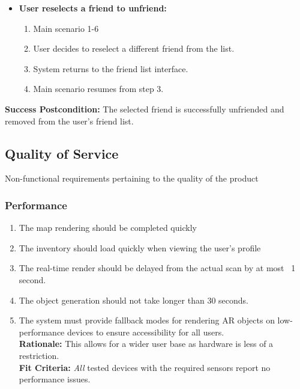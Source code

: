 \documentclass{article}
\begin{document}
\begin{enumerate}[label=\textbf{UC\arabic*}]
\begin{itemize}
              \item[{}] \textbf{User reselects a friend to unfriend:}
                    \begin{enumerate}[label=\textbf{\arabic*.}]
                        \item Main scenario 1-6
                        \item User decides to reselect a different friend from the list.
                        \item System returns to the friend list interface.
                        \item Main scenario resumes from step 3.
                    \end{enumerate}
          \end{itemize}

          \textbf{Success Postcondition:} The selected friend is successfully unfriended and removed from the user's friend list.

\end{enumerate}

\subsection{Quality of Service}

Non-functional requirements pertaining to the quality of the product


\subsubsection{Performance}
\label{sub:performance}

\begin{enumerate}[align=left, label=\textbf{QS-P\arabic*.}]
    \item The map rendering should be completed quickly
    \item The inventory should load quickly when viewing the user’s profile
    \item The real-time render should be delayed from the actual scan by at most ~1 second.
    \item The object generation should not take longer than 30 seconds.
    \item The system must provide fallback modes for rendering AR objects on low-performance devices to ensure accessibility for all users. \\
          {\bf Rationale:} This allows for a wider user base as hardware is less of a restriction. \\
          {\bf Fit Criteria:} \textit{All} tested devices with the required sensors report no performance issues.

\end{enumerate}
\end{document}
